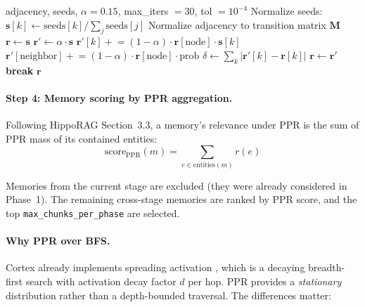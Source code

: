 \documentclass[11pt]{article}
\begin{document}
\begin{algorithm}[t]
\caption{Personalized PageRank (Phase~2)}
\label{alg:ppr}
\begin{algorithmic}[1]
\REQUIRE adjacency, seeds, $\alpha = 0.15$, max\_iters $= 30$, tol $= 10^{-4}$
\STATE Normalize seeds: $\mathbf{s}[k] \leftarrow \text{seeds}[k] / \sum_j \text{seeds}[j]$
\STATE Normalize adjacency to transition matrix $\mathbf{M}$
\STATE $\mathbf{r} \leftarrow \mathbf{s}$ 
  \STATE $\mathbf{r}' \leftarrow \alpha \cdot \mathbf{s}$ 
        \STATE $\mathbf{r}'[k] \mathrel{+}= (1 - \alpha) \cdot \mathbf{r}[\text{node}] \cdot \mathbf{s}[k]$
      \ENDFOR
    \ELSE
        \STATE $\mathbf{r}'[\text{neighbor}] \mathrel{+}= (1 - \alpha) \cdot \mathbf{r}[\text{node}] \cdot \text{prob}$
      \ENDFOR
    \ENDIF
  \ENDFOR
  \STATE $\delta \leftarrow \sum_k |\mathbf{r}'[k] - \mathbf{r}[k]|$
  \STATE $\mathbf{r} \leftarrow \mathbf{r}'$
    \STATE \textbf{break}
  \ENDIF
\ENDFOR
\RETURN $\mathbf{r}$
\end{algorithmic}
\end{algorithm}

\paragraph{Step 4: Memory scoring by PPR aggregation.}
Following HippoRAG Section~3.3, a memory's relevance under PPR is the
sum of PPR mass of its contained entities:
\begin{equation}
\text{score}_{\text{PPR}}(m) = \sum_{e \in \text{entities}(m)} r(e)
\label{eq:ppr-score}
\end{equation}

Memories from the current stage are excluded (they were already
considered in Phase~1).  The remaining cross-stage memories are ranked
by PPR score, and the top \texttt{max\_chunks\_per\_phase} are
selected.

\paragraph{Why PPR over BFS.}
Cortex already implements spreading activation \citep{Collins1975},
which is a decaying breadth-first search with activation decay factor
$d$ per hop.  PPR provides a \emph{stationary} distribution rather
than a depth-bounded traversal.  The differences matter:
\end{document}
